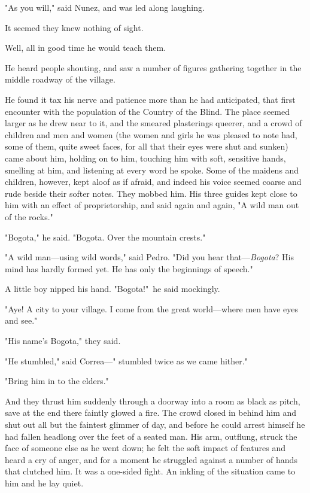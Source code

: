 \documentclass[courier]{sffms}
\begin{document}
"As you will," said Nunez, and was led along laughing.

It seemed they knew nothing of sight.

Well, all in good time he would teach them.

He heard people shouting, and saw a number of figures gathering
together in the middle roadway of the village.

He found it tax his nerve and patience more than he had anticipated,
that first encounter with the population of the Country of the
Blind. The place seemed larger as he drew near to it, and the smeared
plasterings queerer, and a crowd of children and men and women (the
women and girls he was pleased to note had, some of them, quite sweet
faces, for all that their eyes were shut and sunken) came about him,
holding on to him, touching him with soft, sensitive hands, smelling
at him, and listening at every word he spoke. Some of the maidens and
children, however, kept aloof as if afraid, and indeed his voice
seemed coarse and rude beside their softer notes. They mobbed him. His
three guides kept close to him with an effect of proprietorship, and
said again and again, "A wild man out of the rocks."

"Bogota," he said. "Bogota. Over the mountain crests."

"A wild man---using wild words," said Pedro. "Did you hear
that---\emph{Bogota}?  His mind has hardly formed yet. He has only the
beginnings of speech."

A little boy nipped his hand. "Bogota!"\ he said mockingly.

"Aye! A city to your village. I come from the great world---where men
have eyes and see."

"His name's Bogota," they said.

"He stumbled," said Correa---" stumbled twice as we came hither."

"Bring him in to the elders."

And they thrust him suddenly through a doorway into a room as black as
pitch, save at the end there faintly glowed a fire. The crowd closed
in behind him and shut out all but the faintest glimmer of day, and
before he could arrest himself he had fallen headlong over the feet of
a seated man. His arm, outflung, struck the face of someone else as he
went down; he felt the soft impact of features and heard a cry of
anger, and for a moment he struggled against a number of hands that
clutched him. It was a one-sided fight. An inkling of the situation
came to him and he lay quiet.
\end{document}
